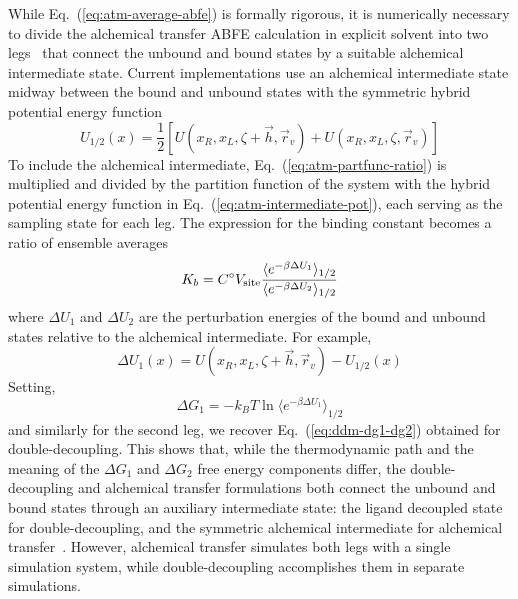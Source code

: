 \documentclass[9pt,bestpractices]{livecoms}
\begin{document}
While Eq.~(\ref{eq:atm-average-abfe}) is formally rigorous, it is numerically necessary to divide the alchemical transfer ABFE calculation in explicit solvent into two legs~\cite{wu2021alchemical,azimi2022relative} that connect the unbound and bound states by a suitable alchemical intermediate state. Current implementations use an alchemical intermediate state midway between the bound and unbound states with the symmetric hybrid potential energy function
\begin{equation}\label{eq:atm-intermediate-pot}
U_{1/2}(x) = \frac12 [ U(x_R, x_L, \zeta + \vec{h}, \vec{r}_v) + U(x_R, x_L, \zeta, \vec{r}_v)  ] 
\end{equation}
To include the alchemical intermediate, Eq.~(\ref{eq:atm-partfunc-ratio}) is multiplied and divided by the partition function of the system with the hybrid potential energy function in Eq.~(\ref{eq:atm-intermediate-pot}), each serving as the sampling state for each leg. The expression for the binding constant becomes a ratio of ensemble averages
\begin{equation}\label{eq:atm-average-abfe-intermediate}
  K_b = C^\circ V_{\rm site} \frac{
    \langle e^{-\beta \Delta U_1} \rangle_{1/2}
  }{
    \langle e^{-\beta \Delta U_2} \rangle_{1/2}
  }
\end{equation}
where $\Delta U_1$ and $\Delta U_2$ are the perturbation energies of the bound and unbound states relative to the alchemical intermediate. For example,
\begin{equation}
\Delta U_1(x) = U(x_R, x_L, \zeta + \vec{h}, \vec{r}_v) - U_{1/2}(x)
\end{equation}
Setting,
\begin{equation}
\Delta G_1 = -k_B T \ln \langle e^{-\beta \Delta U_1} \rangle_{1/2}
\end{equation}
and similarly for the second leg, we recover Eq.~(\ref{eq:ddm-dg1-dg2}) obtained for double-decoupling. This shows that, while the thermodynamic path and the meaning of the $\Delta G_1$ and $\Delta G_2$ free energy components differ, the double-decoupling and alchemical transfer formulations both connect the unbound and bound states through an auxiliary intermediate state: the ligand decoupled state for double-decoupling, and the symmetric alchemical intermediate for alchemical transfer~\cite{azimi2025potential}. However, alchemical transfer simulates both legs with a single simulation system, while double-decoupling accomplishes them in separate simulations.
\end{document}
